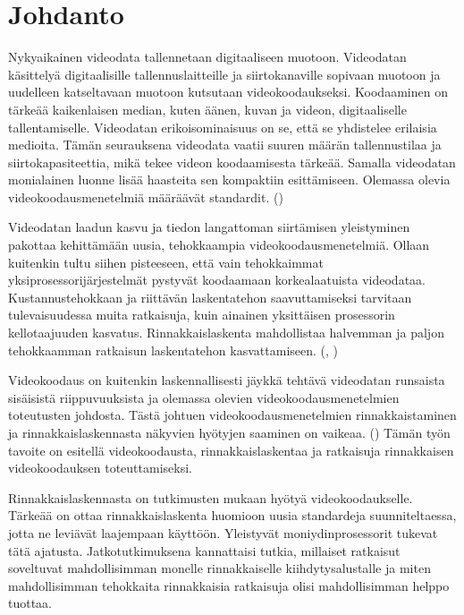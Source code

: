 
\section{Johdanto}

Nykyaikainen videodata tallennetaan digitaaliseen muotoon. Videodatan
käsittelyä digitaalisille tallennuslaitteille ja siirtokanaville sopivaan
muotoon ja uudelleen katseltavaan muotoon kutsutaan videokoodaukseksi.
Koodaaminen on tärkeää kaikenlaisen median, kuten äänen, kuvan ja videon,
digitaaliselle tallentamiselle. Videodatan erikoisominaisuus on se, että
se yhdistelee erilaisia medioita. Tämän seurauksena videodata vaatii suuren
määrän tallennustilaa ja siirtokapasiteettia, mikä tekee videon koodaamisesta
tärkeää. Samalla videodatan monialainen luonne lisää haasteita sen
kompaktiin esittämiseen. Olemassa olevia videokoodausmenetelmiä määräävät
standardit. (\citealt{h264})

Videodatan laadun kasvu ja tiedon langattoman siirtämisen yleistyminen pakottaa
kehittämään uusia, tehokkaampia videokoodausmenetelmiä. Ollaan kuitenkin tultu
siihen pisteeseen, että vain tehokkaimmat yksiprosessorijärjestelmät pystyvät
koodaamaan korkealaatuista videodataa. Kustannustehokkaan ja riittävän
laskentatehon saavuttamiseksi tarvitaan tulevaisuudessa muita ratkaisuja, kuin
ainainen yksittäisen prosessorin kellotaajuuden kasvatus. Rinnakkaislaskenta
mahdollistaa halvemman ja paljon tehokkaamman ratkaisun laskentatehon
kasvattamiseen. (\citealt{chi}, \citealt{intro})

Videokoodaus on kuitenkin laskennallisesti jäykkä tehtävä videodatan runsaista
sisäisistä riippuvuuksista ja olemassa olevien videokoodausmenetelmien
toteutusten johdosta. Tästä johtuen videokoodausmenetelmien rinnakkaistaminen ja
rinnakkaislaskennasta näkyvien hyötyjen saaminen on vaikeaa.
(\citealt{pieters}) Tämän työn tavoite on esitellä videokoodausta,
rinnakkaislaskentaa ja ratkaisuja rinnakkaisen videokoodauksen toteuttamiseksi.

Rinnakkaislaskennasta on tutkimusten mukaan hyötyä videokoodaukselle. Tärkeää
on ottaa rinnakkaislaskenta huomioon uusia standardeja suunniteltaessa, jotta ne leviävät
laajempaan käyttöön. Yleistyvät moniydinprosessorit tukevat tätä ajatusta.
Jatkotutkimuksena kannattaisi tutkia, millaiset ratkaisut
soveltuvat mahdollisimman monelle rinnakkaiselle kiihdytysalustalle ja miten
mahdollisimman tehokkaita rinnakkaisia ratkaisuja olisi mahdollisimman helppo
tuottaa.

